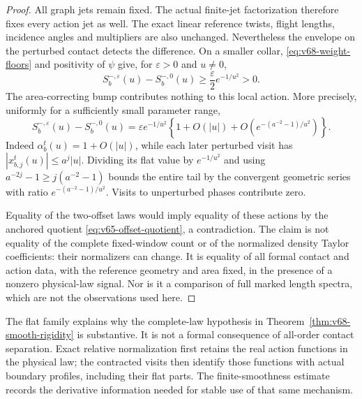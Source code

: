 \begin{proof}
All graph jets remain fixed.  The actual finite-jet factorization
therefore fixes every action jet as well.  The exact linear reference
twists, flight lengths, incidence angles and multipliers are also
unchanged.  Nevertheless the envelope on the perturbed contact detects
the difference.  On a smaller collar, \eqref{eq:v68-weight-floors}
and positivity of $\psi$ give, for $\varepsilon>0$ and $u\ne0$,
\[
 S_b^{-,\varepsilon}(u)-S_b^{-,0}(u)
       \ge\frac{\varepsilon}{2}e^{-1/u^2}>0.
\]
The area-correcting bump contributes nothing to this local action.
More precisely, uniformly for a sufficiently small parameter range,
\begin{equation}\label{eq:v68-flat-signal}
 S_b^{-,\varepsilon}(u)-S_b^{-,0}(u)
   =\varepsilon e^{-1/u^2}
       \left\{1+O(|u|)
           +O\!\left(e^{-(a^{-2}-1)/u^2}\right)\right\}.
\end{equation}
Indeed $\alpha_b^t(u)=1+O(|u|)$, while each later perturbed
visit has $|x^t_{b,j}(u)|\le a^j|u|$.  Dividing its flat value
by $e^{-1/u^2}$ and using
$a^{-2j}-1\ge j(a^{-2}-1)$ bounds the entire tail by the convergent
geometric series with ratio $e^{-(a^{-2}-1)/u^2}$.
Visits to unperturbed phases contribute zero.

Equality of the two-offset laws would imply equality of these actions
by the anchored quotient \eqref{eq:v65-offset-quotient}, a
contradiction.  The claim is not equality of the complete fixed-window
count or of the normalized density Taylor coefficients: their
normalizers can change.  It is equality of all formal contact and
action data, with the reference geometry and area fixed, in the presence
of a nonzero physical-law signal.  Nor is it a comparison of full marked
length spectra, which are not the observations used here.
\end{proof}

The flat family explains why the complete-law hypothesis in
Theorem~\ref{thm:v68-smooth-rigidity} is substantive.  It is not a
formal consequence of all-order contact separation.  Exact relative
normalization first retains the real action functions in the physical
law; the contracted visits then identify those functions with actual
boundary profiles, including their flat parts.  The finite-smoothness
estimate records the derivative information needed for stable use of
that same mechanism.
